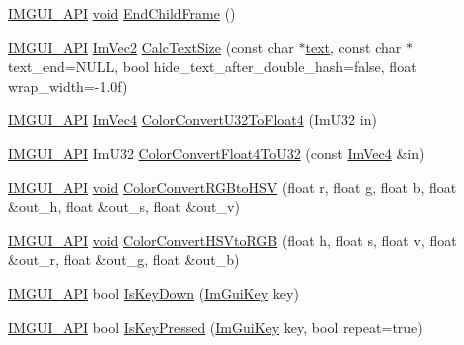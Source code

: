 \begin{DoxyCompactItemize}
\item 
\hyperlink{imgui_8h_a43829975e84e45d1149597467a14bbf5}{I\+M\+G\+U\+I\+\_\+\+A\+PI} \hyperlink{imgui__impl__opengl3__loader_8h_ac668e7cffd9e2e9cfee428b9b2f34fa7}{void} \hyperlink{namespaceImGui_ac4bd9024554b5074805bc0ce3076c514}{End\+Child\+Frame} ()
\item 
\hyperlink{imgui_8h_a43829975e84e45d1149597467a14bbf5}{I\+M\+G\+U\+I\+\_\+\+A\+PI} \hyperlink{structImVec2}{Im\+Vec2} \hyperlink{namespaceImGui_a848b9db6cc4a186751c0ecebcaadc33b}{Calc\+Text\+Size} (const char $\ast$\hyperlink{game__play__state_8cpp_a295b62c787445f811e691da4b10f6be4}{text}, const char $\ast$text\+\_\+end=N\+U\+LL, bool hide\+\_\+text\+\_\+after\+\_\+double\+\_\+hash=false, float wrap\+\_\+width=-\/1.\+0f)
\item 
\hyperlink{imgui_8h_a43829975e84e45d1149597467a14bbf5}{I\+M\+G\+U\+I\+\_\+\+A\+PI} \hyperlink{structImVec4}{Im\+Vec4} \hyperlink{namespaceImGui_a74df648cad381b5ad979c3609b7f4b2a}{Color\+Convert\+U32\+To\+Float4} (Im\+U32 in)
\item 
\hyperlink{imgui_8h_a43829975e84e45d1149597467a14bbf5}{I\+M\+G\+U\+I\+\_\+\+A\+PI} Im\+U32 \hyperlink{namespaceImGui_abe2691de0b1a71c774ab24cc91564a94}{Color\+Convert\+Float4\+To\+U32} (const \hyperlink{structImVec4}{Im\+Vec4} \&in)
\item 
\hyperlink{imgui_8h_a43829975e84e45d1149597467a14bbf5}{I\+M\+G\+U\+I\+\_\+\+A\+PI} \hyperlink{imgui__impl__opengl3__loader_8h_ac668e7cffd9e2e9cfee428b9b2f34fa7}{void} \hyperlink{namespaceImGui_aaed5ed34aaaa02b61cbb67598c0ad9ca}{Color\+Convert\+R\+G\+Bto\+H\+SV} (float r, float g, float b, float \&out\+\_\+h, float \&out\+\_\+s, float \&out\+\_\+v)
\item 
\hyperlink{imgui_8h_a43829975e84e45d1149597467a14bbf5}{I\+M\+G\+U\+I\+\_\+\+A\+PI} \hyperlink{imgui__impl__opengl3__loader_8h_ac668e7cffd9e2e9cfee428b9b2f34fa7}{void} \hyperlink{namespaceImGui_a074427678b3e56378b7dcdefa4c8b5c7}{Color\+Convert\+H\+S\+Vto\+R\+GB} (float h, float s, float v, float \&out\+\_\+r, float \&out\+\_\+g, float \&out\+\_\+b)
\item 
\hyperlink{imgui_8h_a43829975e84e45d1149597467a14bbf5}{I\+M\+G\+U\+I\+\_\+\+A\+PI} bool \hyperlink{namespaceImGui_a82095f2501c1df5ccd1928a53edaad99}{Is\+Key\+Down} (\hyperlink{imgui_8h_aa22ffe36b188427d712447ec465203d4}{Im\+Gui\+Key} key)
\item 
\hyperlink{imgui_8h_a43829975e84e45d1149597467a14bbf5}{I\+M\+G\+U\+I\+\_\+\+A\+PI} bool \hyperlink{namespaceImGui_a477c2ef31c9641b158d78879780bd108}{Is\+Key\+Pressed} (\hyperlink{imgui_8h_aa22ffe36b188427d712447ec465203d4}{Im\+Gui\+Key} key, bool repeat=true)

\end{DoxyCompactItemize}
